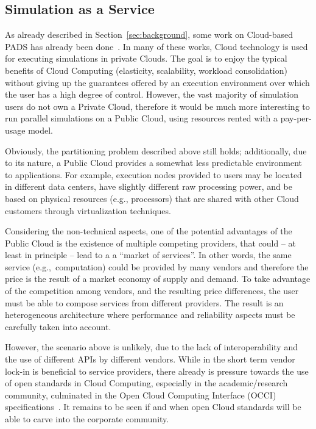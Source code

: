 \documentclass[1p]{elsarticle}
\begin{document}
\subsection{Simulation as a Service}

As already described in Section~\ref{sec:background}, some work on
Cloud-based PADS has already been
done~\cite{fuj2010-cloud1,fuj2010-cloud2,5564701}. In many of these
works, Cloud technology is used for executing simulations in private
Clouds. The goal is to enjoy the typical benefits of Cloud Computing
(elasticity, scalability, workload consolidation) without giving up
the guarantees offered by an execution environment over which the user
has a high degree of control. However, the vast majority of simulation
users do not own a Private Cloud, therefore it would be much more
interesting to run parallel simulations on a Public Cloud, using
resources rented with a pay-per-usage model.

Obviously, the partitioning problem described above still holds;
additionally, due to its nature, a Public Cloud provides a somewhat
less predictable environment to applications. For example, execution
nodes provided to users may be located in different data centers, have
slightly different raw processing power, and be based on physical
resources (e.g., processors) that are shared with other Cloud
customers through virtualization techniques.

Considering the non-technical aspects, one of the potential advantages
of the Public Cloud is the existence of multiple competing providers,
that could -- at least in principle -- lead to a a ``market of
services''. In other words, the same service (e.g.,~computation) could
be provided by many vendors and therefore the price is the result of a
market economy of supply and demand. 
To take advantage of the competition among vendors, and the resulting
price differences, the user must be able to compose services from
different providers. The result is an heterogeneous architecture where
performance and reliability aspects must be carefully taken into
account.

However, the scenario above is unlikely, due to the lack of
interoperability and the use of different APIs by different
vendors. While in the short term vendor lock-in is beneficial to
service providers, there already is pressure towards the use of open
standards in Cloud Computing, especially in the academic/research
community, culminated in the Open Cloud Computing Interface (OCCI)
specifications~\cite{occi}. It remains to be seen if and when open
Cloud standards will be able to carve into the corporate community.
\end{document}
